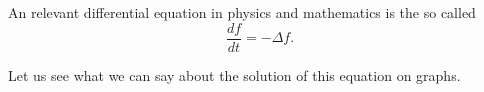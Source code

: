 \documentclass[../2.tex]{subfiles}
\begin{document}
    An relevant differential equation in physics and mathematics is the so called 
    \[ \frac{df}{dt} = -\Delta f . \]
    
    Let us see what we can say about the solution of this equation on graphs.
\end{document}
